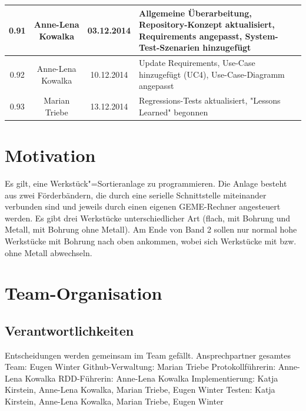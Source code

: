 \documentclass[oneside,a4paper,titlepage]{scrartcl}              %
\begin{document}
\begin{small}
\begin{center}
\begin{tabular}{|c|c|c|p{7.25cm}|}
      \hline
      0.91 & Anne-Lena Kowalka & 03.12.2014 & Allgemeine Überarbeitung, Repository-Konzept aktualisiert, Requirements angepasst, System-Test-Szenarien hinzugefügt\\
      \hline
      0.92 & Anne-Lena Kowalka & 10.12.2014 & Update Requirements, Use-Case hinzugefügt (UC4), Use-Case-Diagramm angepasst\\
      \hline
      0.93 & Marian Triebe & 13.12.2014 & Regressions-Tests aktualisiert, "Lessons Learned" \space begonnen\\
      \hline
    \end{tabular}
  \end{center}
\end{small}

\newpage

\pagestyle{empty}
\tableofcontents

\newpage

\pagestyle{plain}
\setcounter{page}{1}

\section{Motivation}
Es gilt, eine Werkstück"=Sortieranlage zu programmieren. Die Anlage besteht aus zwei
Förderbändern, die durch eine serielle Schnittstelle miteinander verbunden sind und jeweils durch
einen eigenen GEME-Rechner angesteuert werden.
Es gibt drei Werkstücke unterschiedlicher Art (flach, mit Bohrung und Metall, mit Bohrung ohne
Metall). Am Ende von Band 2 sollen nur normal hohe Werkstücke mit Bohrung nach oben
ankommen, wobei sich Werkstücke mit bzw. ohne Metall abwechseln.


\section{Team-Organisation}

\subsection{Verantwortlichkeiten}
Entscheidungen werden gemeinsam im Team gefällt.\newline
Ansprechpartner gesamtes Team: Eugen Winter\newline
Github-Verwaltung: Marian Triebe\newline
Protokollführerin: Anne-Lena Kowalka\newline
RDD-Führerin: Anne-Lena Kowalka\newline
Implementierung: Katja Kirstein, Anne-Lena Kowalka, Marian Triebe, Eugen Winter\newline
Testen: Katja Kirstein, Anne-Lena Kowalka, Marian Triebe, Eugen Winter\newline
\end{document}
